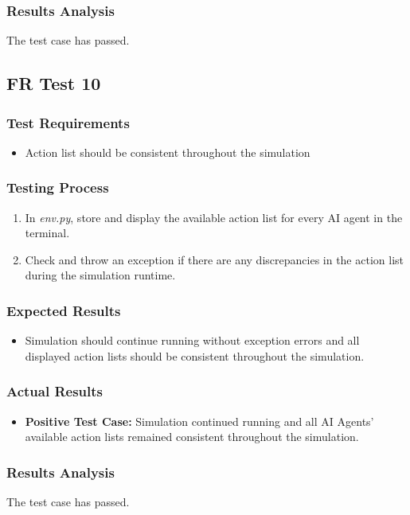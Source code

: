 \documentclass[12pt, titlepage]{article}
\providecommand{\DIFaddbegin}{} %
\providecommand{\DIFaddend}{} %
\begin{document}
\subsubsection{Results Analysis}
The test case has passed.

\subsection{FR Test 10}\DIFaddbegin \label{FRT10} 
\DIFaddend \subsubsection{Test Requirements}
\begin{itemize}
    \item Action list should be consistent throughout the simulation
\end{itemize}
\subsubsection{Testing Process}
\begin{enumerate}
    \item In \textit{env.py}, store and display the available action list for every AI agent in the terminal. 
    \item Check and throw an exception if there are any discrepancies in the action list during the simulation runtime.
\end{enumerate}
\subsubsection{Expected Results}
\begin{itemize}
    \item Simulation should continue running without exception errors and all displayed action lists should be consistent throughout the simulation.
\end{itemize}
\subsubsection{Actual Results}
\begin{itemize}
    \item \textbf{Positive Test Case:} Simulation continued running and all AI Agents' available action lists remained consistent throughout the simulation.
\end{itemize}
\subsubsection{Results Analysis}
The test case has passed.
\end{document}
